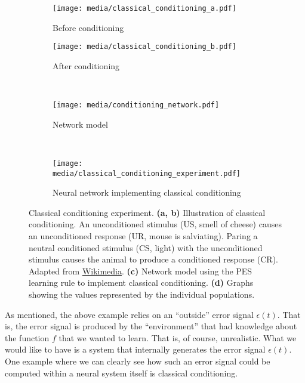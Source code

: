 \documentclass[10pt,letterpaper,oneside]{article}
\begin{document}
\begin{figure}[p]
	\centering%
	\begin{subfigure}{0.5\textwidth}%
		\centering%
		\texttt{[image: media/classical\_conditioning\_a.pdf]}%
		\caption{Before conditioning}%
		\label{fig:classical_conditioning_a}
	\end{subfigure}%
	\begin{subfigure}{0.5\textwidth}%
		\centering%
		\texttt{[image: media/classical\_conditioning\_b.pdf]}%
		\caption{After conditioning}%
		\label{fig:classical_conditioning_b}
	\end{subfigure}\\[0.5cm]
	\begin{subfigure}{\textwidth}%
		\centering%
		\texttt{[image: media/conditioning\_network.pdf]}%
		\caption{Network model}
		\label{fig:conditioning_network}
	\end{subfigure}\\[0.5cm]
	\begin{subfigure}{\textwidth}
		\centering
		\texttt{[image: media/classical\_conditioning\_experiment.pdf]}
		\caption{Neural network implementing classical conditioning}
		\label{fig:classical_conditioning_experiment}
	\end{subfigure}
	\caption{Classical conditioning experiment. \textbf{(a, b)} Illustration of classical conditioning. An unconditioned stimulus (US, smell of cheese) causes an unconditioned response (UR, mouse is salviating). Paring a neutral conditioned stimulus (CS, light) with the unconditioned stimulus causes the animal to produce a conditioned response (CR). Adapted from \href{https://commons.wikimedia.org/wiki/File:Classical_conditioning_-_extinction.svg}{Wikimedia}. \textbf{(c)} Network model using the PES learning rule to implement classical conditioning.  \textbf{(d)} Graphs showing the values represented by the individual populations.}
	\label{fig:classical_conditioning}
\end{figure}

As mentioned, the above example relies on an \enquote{outside} error signal $\epsilon(t)$. That is, the error signal is produced by the \enquote{environment} that had knowledge about the function $f$ that we wanted to learn. That is, of course, unrealistic. What we would like to have is a system that internally generates the error signal $\epsilon(t)$. One example where we can clearly see how such an error signal could be computed within a neural system itself is classical conditioning.
\end{document}
